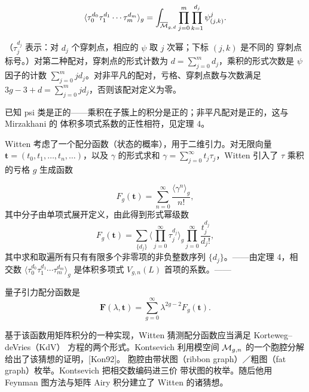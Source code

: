 
\[
\langle\tau_0^{d_0}\tau_1^{d_1}\cdots\tau_m^{d_m}\rangle_g
=\int_{\overline{\mathcal{M}}_{g,d}}\prod_{j=0}^{m}\prod_{k=1}^{d_j}\psi_{(j,k)}^{j}.
\]

（$\tau_j^{d_j}$ 表示：对 $d_j$ 个穿刺点，相应的 $\psi$ 取 $j$ 次幂；下标 $(j,k)$ 是不同的
穿刺点标号。）对第二种配对，穿刺点的形式计数为 $d=\sum_{j=0}^{m}d_j$，乘积的形式次数是
$\psi$ 因子的计数 $\sum_{j=0}^{m}j d_j$。对非平凡的配对，亏格、穿刺点数与次数满足
$3g-3+d=\sum_{j=0}^{m}j d_j$，否则该配对定义为零。


已知 psi 类是正的——乘积在子簇上的积分是正的；非平凡配对是正的，这与 Mirzakhani 的
体积多项式系数的正性相符，见定理 4。

\begin{sloppypar}
Witten 考虑了一个配分函数（状态的概率），用于二维引力。对无限向量
$\mathbf t=(t_0,t_1,\dots,t_n,\dots)$，以及 $\gamma$ 的形式求和
$\gamma=\sum_{j=0}^{\infty}t_j\tau_j$，Witten 引入了 $\tau$ 乘积的亏格 $g$ 生成函数
\end{sloppypar}
\[
F_g(\mathbf t)=\sum_{n=0}^{\infty}\frac{\langle\gamma^n\rangle_g}{n!},
\]
其中分子由单项式展开定义，由此得到形式幂级数
\[
F_g(\mathbf t)=\sum_{\{d_j\}}\Big\langle\prod_{j=0}^{\infty}\tau_j^{d_j}\Big\rangle_g
\prod_{j=0}^{\infty}\frac{t_j^{d_j}}{d_j!},
\]
其中求和取遍所有只有有限多个非零项的非负整数序列 $\{d_j\}$。——由定理 4，相交数
$\langle\tau_0^{d_0}\tau_1^{d_1}\cdots\tau_m^{d_m}\rangle_g$ 是体积多项式 $V_{g,n}(L)$
首项的系数。——

量子引力配分函数是
\[
\mathbf F(\lambda,\mathbf t)=\sum_{g=0}^{\infty}\lambda^{2g-2}F_g(\mathbf t).
\]

基于该函数用矩阵积分的一种实现，Witten 猜测配分函数应当满足 Korteweg--deVries（KdV）
方程的两个形式。Kontsevich 利用模空间 $\mathcal{M}_{g,n}$ 的一个胞腔分解给出了该猜想的证明，[Kon92]。
胞腔由带状图（ribbon graph）／粗图（fat graph）枚举。Kontsevich 把相交数编码进三价
带状图的枚举。随后他用 Feynman 图方法与矩阵 Airy 积分建立了 Witten 的诸猜想。

